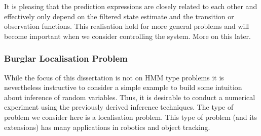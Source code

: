 \documentclass[../masters.tex]{subfiles}
\begin{document}
It is pleasing that the prediction expressions are closely related to each other and effectively only depend on the filtered state estimate and the transition or observation functions. This realisation hold for more general problems and will become important when we consider controlling the system. More on this later.

\subsubsection{Burglar Localisation Problem}
While the focus of this dissertation is not on HMM type problems it is nevertheless instructive to consider a simple example to build some intuition about inference of random variables. Thus, it is desirable to conduct a numerical experiment using the previously derived inference techniques. The type of problem we consider here is a localisation problem. This type of problem (and its extensions) has many applications in robotics and object tracking.
\end{document}
